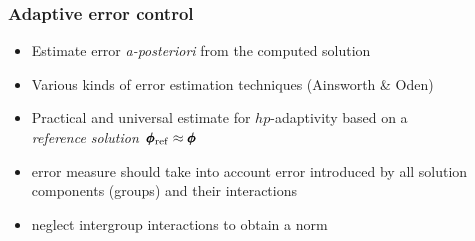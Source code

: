 \begin{frame}[t]
	\frametitle{Adaptive error control}
	  \vspace*{.75cm}
		  \begin{itemize}
		    \item Estimate error \emph{a-posteriori} from the computed solution
		      \item<1-> Various kinds of error estimation techniques (Ainsworth \& Oden)
			  \item<2-> Practical and universal estimate for $hp$-adaptivity based on a\\ \emph{reference solution}~$\pmb{\phi}_{\mathrm{ref}}\approx \pmb{\phi}$\\[.5em]

			  \item<3-> error measure should take into account error introduced by all solution components (groups) and their interactions
			  \item<4-> neglect intergroup interactions to obtain a norm\\[1em]
		  \end{itemize}
\end{frame}
